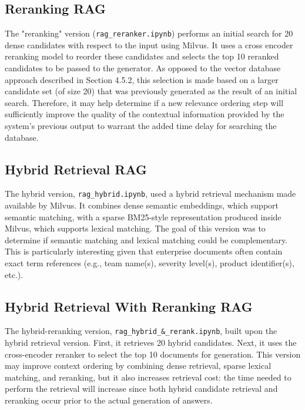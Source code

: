 \subsection{Reranking RAG}

The "reranking" version (\texttt{rag\_reranker.ipynb}) performs an initial search for 20 dense candidates with respect to the input using Milvus. It uses a cross encoder reranking model to reorder these candidates and selects the top 10 reranked candidates to be passed to the generator. As opposed to the vector database approach described in Section 4.5.2, this selection is made based on a larger candidate set (of size 20) that was previously generated as the result of an initial search. Therefore, it may help determine if a new relevance ordering step will sufficiently improve the quality of the contextual information provided by the system's previous output to warrant the added time delay for searching the database.

\subsection{Hybrid Retrieval RAG}

The hybrid version, \texttt{rag\_hybrid.ipynb}, used a hybrid retrieval mechanism made available by Milvus. It combines dense semantic embeddings, which support semantic matching, with a sparse BM25-style representation produced inside Milvus, which supports lexical matching. The goal of this version was to determine if semantic matching and lexical matching could be complementary. This is particularly interesting given that enterprise documents often contain exact term references (e.g., team name(s), severity level(s), product identifier(s), etc.).

\subsection{Hybrid Retrieval With Reranking RAG}

The hybrid-reranking version, \texttt{rag\_hybrid\_\&\_rerank.ipynb}, built upon the hybrid retrieval version. First, it retrieves 20 hybrid candidates. Next, it uses the cross-encoder reranker to select the top 10 documents for generation. This version may improve context ordering by combining dense retrieval, sparse lexical matching, and reranking, but it also increases retrieval cost: the time needed to perform the retrieval will increase since both hybrid candidate retrieval and reranking occur prior to the actual generation of answers.

